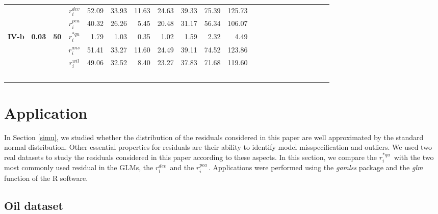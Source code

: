 \documentclass[11pt,authoryear,review,3p,times]{elsarticle}
\newcommand{\dev}{$r_i^{dev}$}
\newcommand{\pea}{$r_i^{pea}$}
\newcommand{\wil}{$r_i^{wil}$}
\newcommand{\aasc}{$r_i^{ans}$}
\newcommand{\aqu}{$r_i^{*qu}$}
\begin{document}
\begin{landscape}
\begin{table}
{\begin{tabular}{ccccrrrrrrr|rrrrrrrrrrr}
    		\cline{1-11}      &       &       & \dev  & 52.09 & 33.93 & 11.63 & 24.63 & 39.33 & 75.39 & 125.73 &       &       &       &       &       &       &       &       &       &       &  \\
    		&       &       & \pea  & 40.32 & 26.26 & 5.45  & 20.48 & 31.17 & 56.34 & 106.07 &       &       &       &       &       &       &       &       &       &       &  \\
    		\textbf{IV-b} & \textbf{0.03} & \textbf{50} & \aqu  & 1.79  & 1.03  & 0.35  & 1.02  & 1.59  & 2.32  & 4.49  &       &       &       &       &       &       &       &       &       &       &  \\
    		&       &       & \aasc & 51.41 & 33.27 & 11.60 & 24.49 & 39.11 & 74.52 & 123.86 &       &       &       &       &       &       &       &       &       &       &  \\
    		&       &       & \wil  & 49.06 & 32.52 & 8.40  & 23.27 & 37.83 & 71.68 & 119.60 &       &       &       &       &       &       &       &       &       &       &  \\
    		\cline{1-11}\   \end{tabular}%
    		\label{adig}%
    }	
    	\end{table}%
    
\end{landscape} 
    
    







\section{Application}\label{apps}


In Section \ref{simu}, we studied whether the distribution of the residuals considered in this paper are well approximated by the standard normal distribution. 
Other essential properties for residuals are their ability to identify model misspecification and outliers.
We used two real datasets to study the residuals considered in this paper according to these aspects.
In this section, we compare the \aqu\, with the two most commonly used residual in the GLMs, the  \dev\, and the \pea\,.
Applications were performed using the \textit{gamlss} package and the \textit{glm} function of the R software.




\subsection{Oil dataset}
\end{document}
